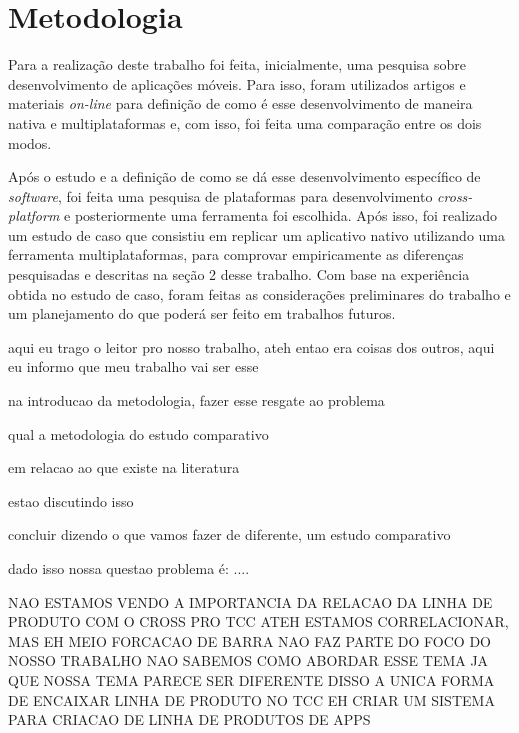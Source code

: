 \chapter{Metodologia} \label{cap:metodologia}
Para a realização deste trabalho foi feita, inicialmente, uma pesquisa sobre desenvolvimento de aplicações móveis. 
Para isso, foram utilizados artigos e materiais \textit{on-line} para definição de como é esse desenvolvimento
de maneira nativa e multiplataformas e, com isso, foi feita uma comparação entre os dois modos. 


Após o estudo e a definição de como se dá esse desenvolvimento específico de \textit{software},
foi feita uma pesquisa de plataformas para desenvolvimento \textit{cross-platform} e posteriormente uma ferramenta foi escolhida. Após isso, foi realizado um estudo de caso que
consistiu em replicar um aplicativo nativo utilizando uma ferramenta multiplataformas, para comprovar empiricamente as diferenças pesquisadas e descritas na seção 2 desse trabalho. 
Com base na experiência obtida no estudo de caso, foram feitas as considerações preliminares
do trabalho e um planejamento do que poderá ser feito em trabalhos futuros.


aqui eu trago o leitor pro nosso trabalho, ateh entao era coisas dos outros, aqui eu informo que meu trabalho vai ser esse

na introducao da metodologia, fazer esse resgate ao problema

qual a metodologia do estudo comparativo

em relacao ao que existe na literatura

estao discutindo isso

concluir dizendo o que vamos fazer de diferente, um estudo comparativo

dado isso nossa questao problema é: ....

NAO ESTAMOS VENDO A IMPORTANCIA DA RELACAO DA LINHA DE PRODUTO COM O CROSS PRO TCC 
ATEH ESTAMOS CORRELACIONAR, MAS EH MEIO FORCACAO DE BARRA
NAO FAZ PARTE DO FOCO DO NOSSO TRABALHO 
NAO SABEMOS COMO ABORDAR ESSE TEMA JA QUE NOSSA TEMA PARECE SER DIFERENTE DISSO
A UNICA FORMA DE ENCAIXAR LINHA DE PRODUTO NO TCC EH CRIAR UM SISTEMA PARA CRIACAO DE LINHA DE PRODUTOS DE APPS


